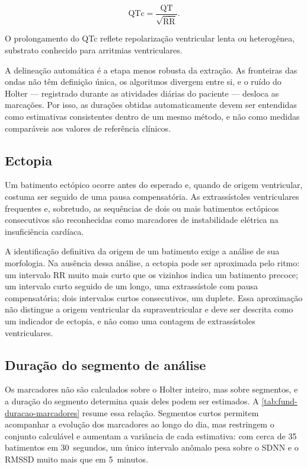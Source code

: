 \begin{equation}
	\mathrm{QTc} = \frac{\mathrm{QT}}{\sqrt{\overline{\mathrm{RR}}}}.
	\label{eq:bazett}
\end{equation}

\noindent
O prolongamento do QTc reflete repolarização ventricular lenta ou
heterogênea, substrato conhecido para arritmias ventriculares.

A delineação automática é a etapa menos robusta da extração. As fronteiras
das ondas não têm definição única, os algoritmos divergem entre si, e o
ruído do Holter --- registrado durante as atividades diárias do paciente ---
desloca as marcações. Por isso, as durações obtidas automaticamente devem
ser entendidas como estimativas consistentes dentro de um mesmo método, e
não como medidas comparáveis aos valores de referência clínicos.

\subsection{Ectopia}
\label{subsec:fund-ectopia}

Um batimento ectópico ocorre antes do esperado e, quando de origem
ventricular, costuma ser seguido de uma pausa compensatória. As
extrassístoles ventriculares frequentes e, sobretudo, as sequências de dois
ou mais batimentos ectópicos consecutivos são reconhecidas como marcadores
de instabilidade elétrica na insuficiência cardíaca.

A identificação definitiva da origem de um batimento exige a análise de sua
morfologia. Na ausência dessa análise, a ectopia pode ser aproximada pelo
ritmo: um intervalo RR muito mais curto que os vizinhos indica um batimento
precoce; um intervalo curto seguido de um longo, uma extrassístole com
pausa compensatória; dois intervalos curtos consecutivos, um duplete. Essa
aproximação não distingue a origem ventricular da supraventricular e deve
ser descrita como um indicador de ectopia, e não como uma contagem de
extrassístoles ventriculares.

\subsection{Duração do segmento de análise}
\label{subsec:fund-duracao-segmento}

Os marcadores não são calculados sobre o Holter inteiro, mas sobre
segmentos, e a duração do segmento determina quais deles podem ser
estimados. A \autoref{tab:fund-duracao-marcadores} resume essa relação.
Segmentos curtos permitem acompanhar a evolução dos marcadores ao longo do
dia, mas restringem o conjunto calculável e aumentam a variância de cada
estimativa: com cerca de 35 batimentos em 30~segundos, um único intervalo
anômalo pesa sobre o SDNN e o RMSSD muito mais que em 5~minutos.

